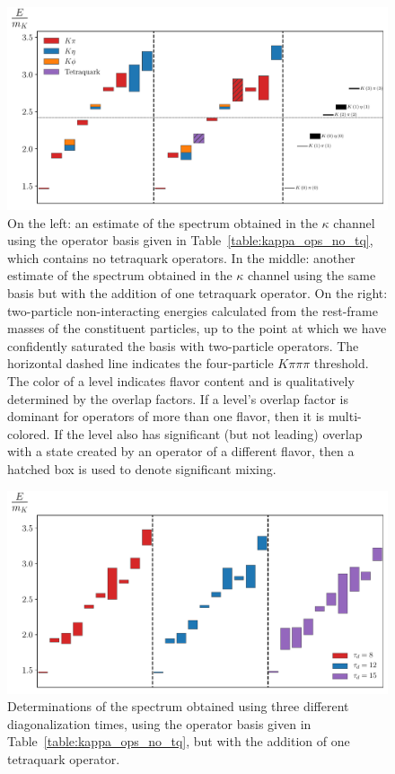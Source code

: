 \begin{figure}
  \centering
  \hspace*{-0.5in}\includegraphics[width=\textwidth]{figures/spectrum_a1g/staircase.pdf}
  \caption[A comparison of spectrum determinations made in the $\kappa$ channel.]{On the left: an estimate of the spectrum obtained in the $\kappa$ channel using the operator basis given in Table~\ref{table:kappa_ops_no_tq}, which contains no tetraquark operators. In the middle: another estimate of the spectrum obtained in the $\kappa$ channel using the same basis but with the addition of one tetraquark operator. On the right: two-particle non-interacting energies calculated from the rest-frame masses of the constituent particles, up to the point at which we have confidently saturated the basis with two-particle operators. The horizontal dashed line indicates the four-particle $K\pi\pi\pi$ threshold. The color of a level indicates flavor content and is qualitatively determined by the overlap factors. If a level's overlap factor is dominant for operators of more than one flavor, then it is multi-colored. If the level also has significant (but not leading) overlap with a state created by an operator of a different flavor, then a hatched box is used to denote significant mixing.}
  \label{fig:kappa_spectrum}
\end{figure}

\begin{figure}
  \centering
  \hspace*{-0.5in}\includegraphics[width=\textwidth]{figures/spectrum_a1g/staircase_tau_d.pdf}
  \caption{Determinations of the spectrum obtained using three different diagonalization times, using the operator basis given in Table~\ref{table:kappa_ops_no_tq}, but with the addition of one tetraquark operator.}
  \label{fig:spectrum_td}
\end{figure}

